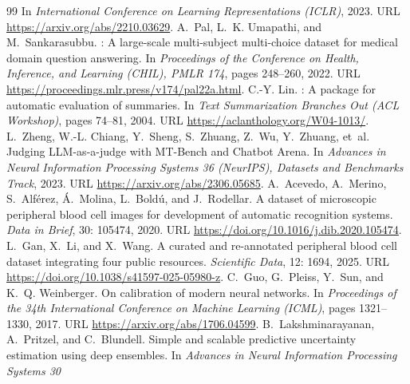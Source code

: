 {\begin{thebibliography}{99}
\newblock In \emph{International Conference on Learning Representations
  (ICLR)}, 2023.
\newblock URL \url{https://arxiv.org/abs/2210.03629}.
A.~Pal, L.~K. Umapathi, and M.~Sankarasubbu.
: A large-scale multi-subject multi-choice dataset for
  medical domain question answering.
\newblock In \emph{Proceedings of the Conference on Health, Inference, and
  Learning (CHIL), PMLR 174}, pages 248--260, 2022.
\newblock URL \url{https://proceedings.mlr.press/v174/pal22a.html}.
C.-Y. Lin.
: A package for automatic evaluation of summaries.
\newblock In \emph{Text Summarization Branches Out (ACL Workshop)}, pages
  74--81, 2004.
\newblock URL \url{https://aclanthology.org/W04-1013/}.
L.~Zheng, W.-L. Chiang, Y.~Sheng, S.~Zhuang, Z.~Wu, Y.~Zhuang, et~al.
\newblock Judging {LLM}-as-a-judge with {MT-Bench} and {Chatbot Arena}.
\newblock In \emph{Advances in Neural Information Processing Systems 36
  (NeurIPS), Datasets and Benchmarks Track}, 2023.
\newblock URL \url{https://arxiv.org/abs/2306.05685}.
A.~Acevedo, A.~Merino, S.~Alf{\'e}rez, {\'A}.~Molina, L.~Bold{\'u}, and
  J.~Rodellar.
\newblock A dataset of microscopic peripheral blood cell images for development
  of automatic recognition systems.
\newblock \emph{Data in Brief}, 30: 105474, 2020.
\newblock URL \url{https://doi.org/10.1016/j.dib.2020.105474}.
L.~Gan, X.~Li, and X.~Wang.
\newblock A curated and re-annotated peripheral blood cell dataset integrating
  four public resources.
\newblock \emph{Scientific Data}, 12: 1694, 2025.
\newblock URL \url{https://doi.org/10.1038/s41597-025-05980-z}.
C.~Guo, G.~Pleiss, Y.~Sun, and K.~Q. Weinberger.
\newblock On calibration of modern neural networks.
\newblock In \emph{Proceedings of the 34th International Conference on Machine
  Learning (ICML)}, pages 1321--1330, 2017.
\newblock URL \url{https://arxiv.org/abs/1706.04599}.
B.~Lakshminarayanan, A.~Pritzel, and C.~Blundell.
\newblock Simple and scalable predictive uncertainty estimation using deep
  ensembles.
\newblock In \emph{Advances in Neural Information Processing Systems 30
}
\end{thebibliography}}
